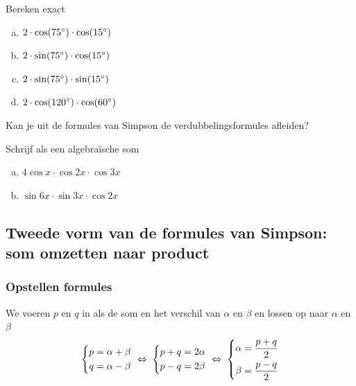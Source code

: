 \documentclass[a4paper,12pt]{article}
\begin{document}
\begin{oefening}
Bereken exact
\begin{enumerate}[(a)]
\itemsep.5em
  \item $2\cdot \cos(75^\circ)\cdot \cos(15^\circ)$
  \item $2\cdot \sin(75^\circ)\cdot \cos(15^\circ)$
  \item $2\cdot \sin(75^\circ)\cdot \sin(15^\circ)$
  \item $2\cdot \cos(120^\circ)\cdot \cos(60^\circ)$
\end{enumerate}
\end{oefening}

\begin{oefening}
Kan je uit de formules van Simpson de verdubbelingsformules afleiden?
\end{oefening}

\begin{oefening}
Schrijf als een algebraïsche som
\begin{enumerate}[(a)]
\itemsep.5em
  \item $4 \cos x \cdot \cos 2x \cdot \cos 3x$
  \item $\sin 6x \cdot \sin 3x \cdot \cos 2x$
\end{enumerate}
\end{oefening}


\newpage
\subsection{Tweede vorm van de formules van Simpson: som omzetten naar product}

\subsubsection*{Opstellen formules}

We voeren $p$ en $q$ in als de som en het verschil van $\alpha$ en $\beta$ en lossen op naar $\alpha$ en $\beta$
$$
  \left\{\begin{aligned}p&=\alpha+\beta\\q&=\alpha-\beta\end{aligned}\right. 
  \;\Leftrightarrow\; \left\{\begin{aligned}p+q&=2\alpha\\p-q&=2\beta\end{aligned}\right.
  \;\Leftrightarrow\; \left\{\begin{aligned}\alpha&=\dfrac{p+q}{2}\\\beta&=\dfrac{p-q}{2}\end{aligned}\right.
$$
\end{document}
